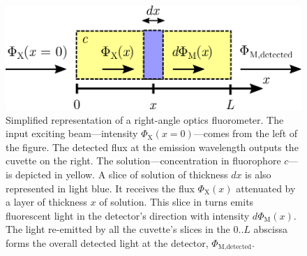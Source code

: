 \begin{figure}
	\centering
	\includegraphics[scale=0.7]{2_appendices/figures/right_angle_scheme.pdf}
	\caption[Right-angle optics scheme.]{Simplified representation of a right-angle optics fluorometer. The input exciting beam---intensity $\Phi_\text{X}(x=0)$---comes from the left of the figure. The detected flux at the emission wavelength outputs the cuvette on the right. The solution---concentration in fluorophore $c$---is depicted in yellow. A slice of solution of thickness $dx$ is also represented in light blue. It receives the flux $\Phi_\text{X}(x)$ attenuated by a layer of thickness $x$ of solution. This slice in turns emits fluorescent light in the detector's direction with intensity $d\Phi_\text{M}(x)$. The  light re-emitted by all the cuvette's slices in the 0..$L$ abscissa forms the overall detected light at the detector, $\Phi_\text{M,detected}$.}
	\label{annfig:fluo_quenching:fluo_right_spectro}
\end{figure}


